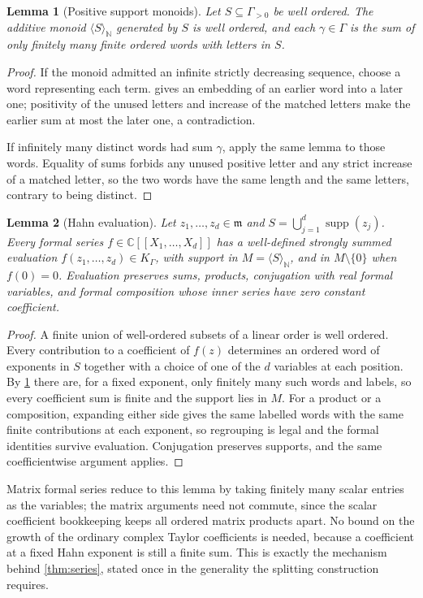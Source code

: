 \documentclass[11pt,a4paper]{article}
\numberwithin{equation}{section}
\newtheorem{lemma}[lemma]{Lemma}
\theoremstyle{definition}
\theoremstyle{remark}
\newcommand{\C}{\mathbb C}
\newcommand{\N}{\mathbb N}
\newcommand{\mm}{\mathfrak m}
\newcommand{\supp}{\operatorname{supp}}
\begin{document}
\begin{lemma}[Positive support monoids]\label{spec:lem:neumann}
Let $S\subseteq\Gamma_{>0}$ be well ordered. The additive monoid
$\langle S\rangle_\N$ generated by $S$ is well ordered, and each
$\gamma\in\Gamma$ is the sum of only finitely many finite ordered words with
letters in $S$.
\end{lemma}
\begin{proof}
If the monoid admitted an infinite strictly decreasing sequence, choose a
word representing each term.  gives an embedding of an
earlier word into a later one; positivity of the unused letters and increase
of the matched letters make the earlier sum at most the later one, a
contradiction.

If infinitely many distinct words had sum $\gamma$, apply the same lemma to
those words. Equality of sums forbids any unused positive letter and any
strict increase of a matched letter, so the two words have the same length
and the same letters, contrary to being distinct.
\end{proof}

\begin{lemma}[Hahn evaluation]\label{spec:lem:evaluate}
Let $z_1,\ldots,z_d\in\mm$ and $S=\bigcup_{j=1}^d\supp(z_j)$. Every formal
series $f\in\C[[X_1,\ldots,X_d]]$ has a well-defined strongly summed
evaluation $f(z_1,\ldots,z_d)\in K_\Gamma$, with support in
$M=\langle S\rangle_\N$, and in $M\setminus\{0\}$ when $f(0)=0$. Evaluation
preserves sums, products, conjugation with real formal variables, and formal
composition whose inner series have zero constant coefficient.
\end{lemma}
\begin{proof}
A finite union of well-ordered subsets of a linear order is well ordered.
Every contribution to a coefficient of $f(z)$ determines an ordered word of
exponents in $S$ together with a choice of one of the $d$ variables at each
position. By \cref{spec:lem:neumann} there are, for a fixed exponent, only
finitely many such words and labels, so every coefficient sum is finite and
the support lies in $M$. For a product or a composition, expanding either
side gives the same labelled words with the same finite contributions at
each exponent, so regrouping is legal and the formal identities survive
evaluation. Conjugation preserves supports, and the same coefficientwise
argument applies.
\end{proof}

Matrix formal series reduce to this lemma by taking finitely many scalar
entries as the variables; the matrix arguments need not commute, since the scalar
coefficient bookkeeping keeps all ordered matrix products apart. No bound on
the growth of the ordinary complex Taylor coefficients is needed, because a
coefficient at a fixed Hahn exponent is still a finite sum. This is exactly
the mechanism behind \cref{thm:series}, stated once in the generality the
splitting construction requires.
\end{document}
